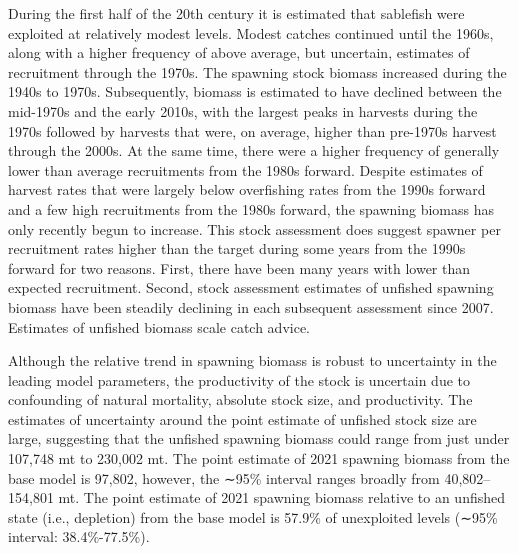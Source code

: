 \documentclass[11pt,
  english,
  a4paper,
]{article}
\begin{document}
During the first half of the 20th century it is estimated that sablefish were exploited at relatively modest levels. Modest catches continued until the 1960s, along with a higher frequency of above average, but uncertain, estimates of recruitment through the 1970s. The spawning stock biomass increased during the 1940s to 1970s. Subsequently, biomass is estimated to have declined between the mid-1970s and the early 2010s, with the largest peaks in harvests during the 1970s followed by harvests that were, on average, higher than pre-1970s harvest through the 2000s. At the same time, there were a higher frequency of generally lower than average recruitments from the 1980s forward. Despite estimates of harvest rates that were largely below overfishing rates from the 1990s forward and a few high recruitments from the 1980s forward, the spawning biomass has only recently begun to increase. This stock assessment does suggest spawner per recruitment rates higher than the target during some years from the 1990s forward for two reasons. First, there have been many years with lower than expected recruitment. Second, stock assessment estimates of unfished spawning biomass have been steadily declining in each subsequent assessment since 2007. Estimates of unfished biomass scale catch advice.

\leavevmode\tagmcend\tagstructend\par


Although the relative trend in spawning biomass is robust to uncertainty in the leading model parameters, the productivity of the stock is uncertain due to confounding of natural mortality, absolute stock size, and productivity. The estimates of uncertainty around the point estimate of unfished stock size are large, suggesting that the unfished spawning biomass could range from just under 107,748 mt to 230,002 mt. The point estimate of 2021 spawning biomass from the base model is 97,802, however, the ∼95\% interval ranges broadly from 40,802--154,801 mt. The point estimate of 2021 spawning biomass relative to an unfished state (i.e., depletion) from the base model is 57.9\% of unexploited levels (∼95\% interval: 38.4\%-77.5\%).

\leavevmode\tagmcend\tagstructend\par
\end{document}
